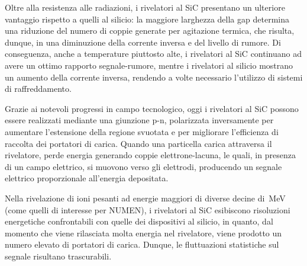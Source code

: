 Oltre alla resistenza alle radiazioni, i rivelatori al SiC presentano un ulteriore vantaggio rispetto a quelli al silicio: la maggiore larghezza della gap determina una riduzione del numero di coppie generate per agitazione termica, che risulta, dunque, in una diminuzione della corrente inversa e del livello di rumore.
Di conseguenza, anche a temperature piuttosto alte, i rivelatori al SiC continuano ad avere un ottimo rapporto segnale-rumore, mentre i rivelatori al silicio mostrano un aumento della corrente inversa, rendendo a volte necessario l'utilizzo di sistemi di raffreddamento.

Grazie ai notevoli progressi in campo tecnologico, oggi i rivelatori al SiC possono essere realizzati mediante una giunzione p-n, polarizzata inversamente per aumentare l'estensione della regione svuotata e per migliorare l'efficienza di raccolta dei portatori di carica.
Quando una particella carica attraversa il rivelatore, perde energia generando coppie elettrone-lacuna, le quali, in presenza di un campo elettrico, si muovono verso gli elettrodi, producendo un segnale elettrico proporzionale all'energia depositata.

Nella rivelazione di ioni pesanti ad energie maggiori di diverse decine di~MeV (come quelli di interesse per NUMEN), i rivelatori al SiC esibiscono risoluzioni energetiche confrontabili con quelle dei dispositivi al silicio, in quanto, dal momento che viene rilasciata molta energia nel rivelatore, viene prodotto un numero elevato di portatori di carica.
Dunque, le fluttuazioni statistiche sul segnale risultano trascurabili.

